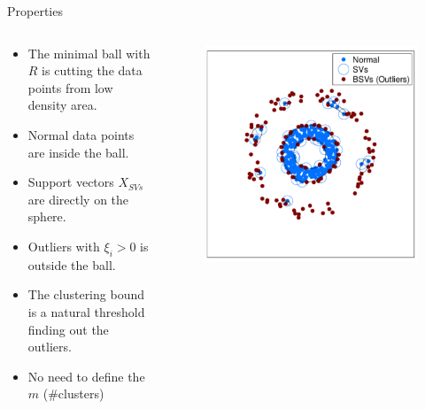 \begin{frame}{Properties}
\begin{columns}
\begin{column}{0.65\textwidth}
\begin{itemize}
\item The minimal ball with $R$ is cutting the data points from low density area.
\item Normal data points are inside the ball.
\item Support vectors $X_{SVs}$ are directly on the sphere.
\item Outliers with $\xi_i > 0$ is outside the ball.
\item The clustering bound is a natural threshold finding out the outliers. 
\item No need to define the $m$ (\#clusters)
\end{itemize}
\end{column}
\begin{column}{.35\textwidth}
\begin{figure}
\hskip-20pt
\includegraphics[scale=0.3]{imgs/svc3.pdf}
\end{figure}
\end{column}
\end{columns}
\end{frame}



